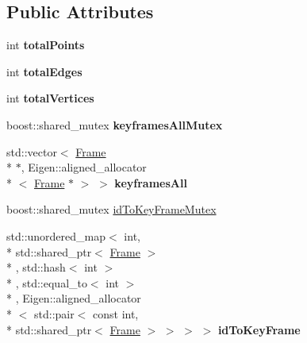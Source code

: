 \subsection*{Public Attributes}
\begin{DoxyCompactItemize}
\item 
\hypertarget{classlsd__slam_1_1_key_frame_graph_a8ec7de131b7f76f8ec2e39a61749df2c}{int {\bfseries total\-Points}}\label{classlsd__slam_1_1_key_frame_graph_a8ec7de131b7f76f8ec2e39a61749df2c}

\item 
\hypertarget{classlsd__slam_1_1_key_frame_graph_a8748ec0a5f59cf2ce97897564bf33cae}{int {\bfseries total\-Edges}}\label{classlsd__slam_1_1_key_frame_graph_a8748ec0a5f59cf2ce97897564bf33cae}

\item 
\hypertarget{classlsd__slam_1_1_key_frame_graph_aac32e1096f7100dd4d53f362a72d274c}{int {\bfseries total\-Vertices}}\label{classlsd__slam_1_1_key_frame_graph_aac32e1096f7100dd4d53f362a72d274c}

\item 
\hypertarget{classlsd__slam_1_1_key_frame_graph_a83c40c8d72058ddc99962be77f53e4a6}{boost\-::shared\-\_\-mutex {\bfseries keyframes\-All\-Mutex}}\label{classlsd__slam_1_1_key_frame_graph_a83c40c8d72058ddc99962be77f53e4a6}

\item 
\hypertarget{classlsd__slam_1_1_key_frame_graph_a7af6ef4d5240a03c7871f64ab96c67cc}{std\-::vector$<$ \hyperlink{classlsd__slam_1_1_frame}{Frame} \\*
$\ast$, Eigen\-::aligned\-\_\-allocator\\*
$<$ \hyperlink{classlsd__slam_1_1_frame}{Frame} $\ast$ $>$ $>$ {\bfseries keyframes\-All}}\label{classlsd__slam_1_1_key_frame_graph_a7af6ef4d5240a03c7871f64ab96c67cc}

\item 
boost\-::shared\-\_\-mutex \hyperlink{classlsd__slam_1_1_key_frame_graph_aec658110a47437fdf2aa9c2fe2a074b4}{id\-To\-Key\-Frame\-Mutex}
\item 
\hypertarget{classlsd__slam_1_1_key_frame_graph_a478514f46156cc94b4fdc2479fa2323c}{std\-::unordered\-\_\-map$<$ int, \\*
std\-::shared\-\_\-ptr$<$ \hyperlink{classlsd__slam_1_1_frame}{Frame} $>$\\*
, std\-::hash$<$ int $>$\\*
, std\-::equal\-\_\-to$<$ int $>$\\*
, Eigen\-::aligned\-\_\-allocator\\*
$<$ std\-::pair$<$ const int, \\*
std\-::shared\-\_\-ptr$<$ \hyperlink{classlsd__slam_1_1_frame}{Frame} $>$ $>$ $>$ $>$ {\bfseries id\-To\-Key\-Frame}}\label{classlsd__slam_1_1_key_frame_graph_a478514f46156cc94b4fdc2479fa2323c}


\end{DoxyCompactItemize}
